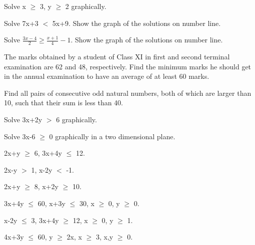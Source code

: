 \item Solve  x $\geq$ 3, y $\geq$ 2 graphically.
\\
\solution 


    \item Solve 7x+3 $<$ 5x+9. Show the graph of the solutions on number line.
\\
\solution 

    \item Solve $\frac{3x-4}{2} \geq \frac{x+1}{4}-1$. Show the graph of the solutions on number line.
\\
\solution 

    \item The marks obtained by a student of Class XI in first and second terminal examination are 62 and 48, respectively. Find the minimum marks he should get in the annual examination to have an average of at least 60 marks.
\\
\solution 

    \item Find all pairs of consecutive odd natural numbers, both of which are larger than 10, such that their sum is less than 40.
\\
\solution 

    \item Solve 3x+2y $>$ 6 graphically.
\\
\solution 

    \item Solve 3x-6 $\geq$ 0 graphically in a two dimensional plane.
\\
\solution 
    
\item 2x+y $\geq$ 6, 3x+4y $\leq$ 12.
    \\
    \solution
    
    \item 2x-y $>$ 1, x-2y $<$ -1.
    \\
    \solution
    

    
    \item 2x+y $\geq$ 8, x+2y $\geq$ 10.
    \\
    \solution
    
    \item 3x+4y $\leq$ 60, x+3y $\leq$ 30, x $\geq$ 0, y $\geq$ 0.
    \\
    \solution
    
    \item x-2y $\leq$ 3, 3x+4y $\geq$ 12, x $\geq$ 0, y $\geq$ 1.
    \\
    \solution
    
    \item 4x+3y $\leq$ 60, y $\geq$ 2x, x $\geq$ 3, x,y $\geq$ 0.
    \\
    \solution
    
